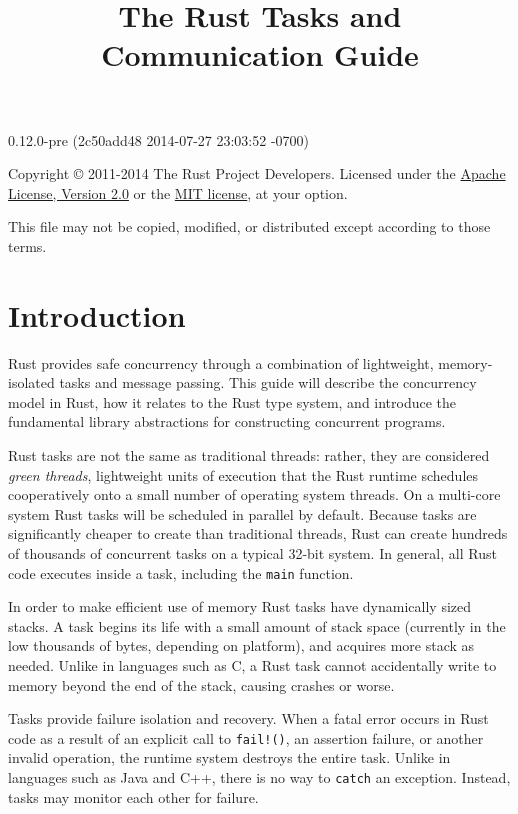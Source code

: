 \documentclass[]{article}
\title{The Rust Tasks and Communication Guide}
\begin{document}
\maketitle

0.12.0-pre (2c50add48 2014-07-27 23:03:52 -0700)

Copyright © 2011-2014 The Rust Project Developers. Licensed under the
\href{http://www.apache.org/licenses/LICENSE-2.0}{Apache License,
Version 2.0} or the \href{http://opensource.org/licenses/MIT}{MIT
license}, at your option.

This file may not be copied, modified, or distributed except according
to those terms.

{
\hypersetup{linkcolor=black}
\setcounter{tocdepth}{3}
\tableofcontents
}
\section{Introduction}\label{introduction}

Rust provides safe concurrency through a combination of lightweight,
memory-isolated tasks and message passing. This guide will describe the
concurrency model in Rust, how it relates to the Rust type system, and
introduce the fundamental library abstractions for constructing
concurrent programs.

Rust tasks are not the same as traditional threads: rather, they are
considered \emph{green threads}, lightweight units of execution that the
Rust runtime schedules cooperatively onto a small number of operating
system threads. On a multi-core system Rust tasks will be scheduled in
parallel by default. Because tasks are significantly cheaper to create
than traditional threads, Rust can create hundreds of thousands of
concurrent tasks on a typical 32-bit system. In general, all Rust code
executes inside a task, including the \texttt{main} function.

In order to make efficient use of memory Rust tasks have dynamically
sized stacks. A task begins its life with a small amount of stack space
(currently in the low thousands of bytes, depending on platform), and
acquires more stack as needed. Unlike in languages such as C, a Rust
task cannot accidentally write to memory beyond the end of the stack,
causing crashes or worse.

Tasks provide failure isolation and recovery. When a fatal error occurs
in Rust code as a result of an explicit call to \texttt{fail!()}, an
assertion failure, or another invalid operation, the runtime system
destroys the entire task. Unlike in languages such as Java and C++,
there is no way to \texttt{catch} an exception. Instead, tasks may
monitor each other for failure.
\end{document}
